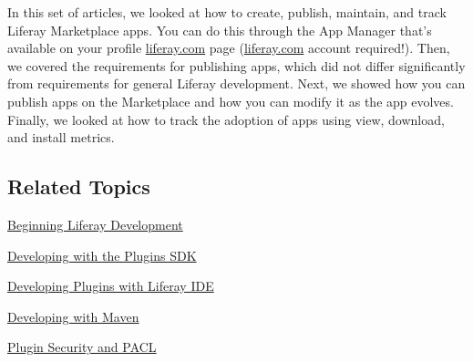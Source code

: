 In this set of articles, we looked at how to create, publish, maintain,
and track Liferay Marketplace apps. You can do this through the App
Manager that's available on your profile
\href{http://liferay.com}{liferay.com} page
(\href{http://liferay.com}{liferay.com} account required!). Then, we
covered the requirements for publishing apps, which did not differ
significantly from requirements for general Liferay development. Next,
we showed how you can publish apps on the Marketplace and how you can
modify it as the app evolves. Finally, we looked at how to track the
adoption of apps using view, download, and install metrics.

\subsection{Related Topics}\label{related-topics}

\href{/develop/learning-paths/-/knowledge_base/6-2/beginning-liferay-development}{Beginning
Liferay Development}

\href{/docs/6-2/tutorials/-/knowledge_base/t/plugins-sdk}{Developing
with the Plugins SDK}

\href{/docs/6-2/tutorials/-/knowledge_base/t/liferay-ide}{Developing
Plugins with Liferay IDE}

\href{/docs/6-2/tutorials/-/knowledge_base/t/maven}{Developing with
Maven}

\href{/docs/6-2/tutorials/-/knowledge_base/t/plugin-security-and-pacl}{Plugin
Security and PACL}
